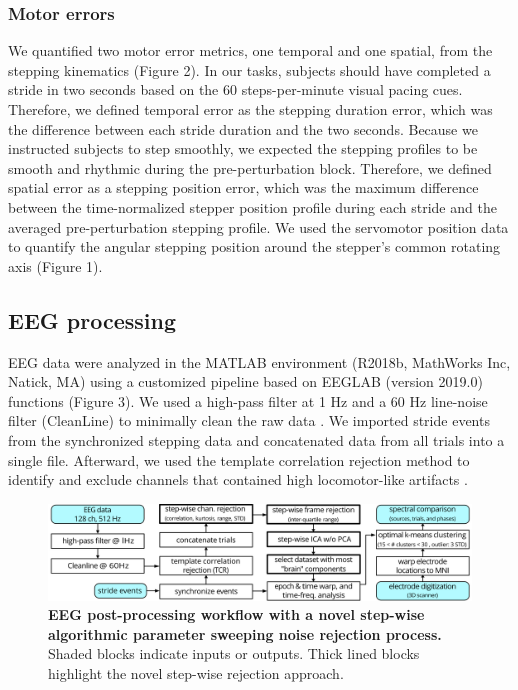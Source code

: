\documentclass[shortpaper,twoside,web]{ieeecolor}
\begin{document}
\subsubsection{Motor errors}
We quantified two motor error metrics, one temporal and one spatial, from the stepping kinematics (Figure 2). In our tasks, subjects should have completed a stride in two seconds based on the 60 steps-per-minute visual pacing cues. Therefore, we defined temporal error as the stepping duration error, which was the difference between each stride duration and the two seconds. Because we instructed subjects to step smoothly, we expected the stepping profiles to be smooth and rhythmic during the pre-perturbation block. Therefore, we defined spatial error as a stepping position error, which was the maximum difference between the time-normalized stepper position profile during each stride and the averaged pre-perturbation stepping profile. We used the servomotor position data to quantify the angular stepping position around the stepper's common rotating axis (Figure 1).

\subsection{EEG processing}
EEG data were analyzed in the MATLAB environment (R2018b, MathWorks Inc, Natick, MA) using a customized pipeline based on EEGLAB (version 2019.0) functions \cite{Delorme2004-yy} (Figure 3). We used a high-pass filter at 1 Hz and a 60 Hz line-noise filter (CleanLine) to minimally clean the raw data \cite{Mullen2012-rh,Winkler2015-br}. We imported stride events from the synchronized stepping data and concatenated data from all trials into a single file. Afterward, we used the template correlation rejection method to identify and exclude channels that contained high locomotor-like artifacts \cite{Oliveira2017-pk}.

\begin{figure}[!ht]
\centerline{\includegraphics{figures/03_EEG workflow.jpg}}
\caption{\textbf{EEG post-processing workflow with a novel step-wise algorithmic parameter sweeping noise rejection process.} Shaded blocks indicate inputs or outputs. Thick lined blocks highlight the novel step-wise rejection approach.}
\label{fig3}
\end{figure}
\end{document}

